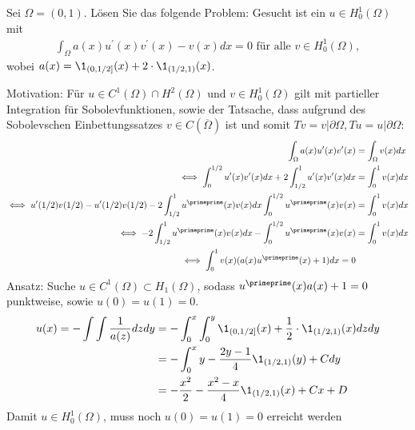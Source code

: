 
\begin{exercise}

Sei $\Omega = (0,1)$. Lösen Sie das folgende Problem: Gesucht ist ein $u \in H_0^1(\Omega)$ mit
\begin{align*}
  \int_\Omega a(x)u^{\prime}(x)v^{\prime}(x) - v(x) dx = 0 \text{ für alle } v \in H_0^1(\Omega),
\end{align*}
wobei $a(x) = \1_{(0,1/2]}(x) + 2\cdot\1_{(1/2,1)}(x)$.
\end{exercise}


\begin{solution}
Motivation: Für $u \in C^1(\Omega) \cap H^2(\Omega)$ und $v \in H_0^1(\Omega)$ gilt
mit partieller Integration für Sobolevfunktionen, sowie der Tatsache, dass aufgrund
des Sobolevschen Einbettungssatzes $v \in C(\overline{\Omega})$ ist und somit
$Tv = v|\partial\Omega, Tu = u|\partial\Omega$:
\begin{align*}
  \int_\Omega a(x)u^{\prime}(x)v^{\prime}(x) &= \int_\Omega v(x) dx \\
  \iff \int_0^{1/2} u^{\prime}(x)v^{\prime}(x)dx + 2\int_{1/2}^1 u^{\prime}(x)v^{\prime}(x) dx &= \int_0^1 v(x) dx \\
  \iff u^{\prime}(1/2)v(1/2) - u^{\prime}(1/2)v(1/2) -
  2\int_{1/2}^1 u^{\primeprime}(x)v(x) dx \int_0^{1/2}u^{\primeprime}(x)v(x) &= \int_0^1 v(x) dx \\
  \iff - 2\int_{1/2}^1 u^{\primeprime}(x)v(x) dx - \int_0^{1/2}u^{\primeprime}(x)v(x) &= \int_0^1 v(x) dx \\
  \iff \int_0^1 v(x)(a(x)u^{\primeprime}(x) + 1) dx = 0
\end{align*}
Ansatz: Suche $u \in C^1(\Omega) \subset H_1(\Omega)$, sodass $u^{\primeprime}(x)a(x) + 1 = 0$ punktweise, sowie $u(0) = u(1) = 0$.
\begin{align*}
  u(x) = -\int\int \frac{1}{a(z)} dz dy  &=
  -\int_0^x\int_0^y \1_{(0,1/2]}(x) + \frac{1}{2}\cdot\1_{(1/2,1)}(x) dz dy  \\
  &= -\int_0^x y - \frac{2y-1}{4}\1_{(1/2,1)}(y) + C dy \\
  &= -\frac{x^2}{2} - \frac{x^2-x}{4}\1_{(1/2,1)}(x) + Cx + D
\end{align*}
Damit $u \in H_0^1(\Omega)$, muss noch $u(0) = u(1) = 0$ erreicht werden
\begin{align*}

\end{align*}
\end{solution}
